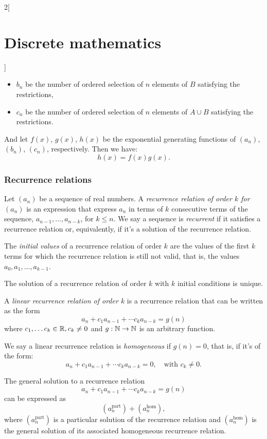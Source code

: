 \documentclass[../../../main.tex]{subfiles}
\begin{document}
\begin{multicols}{2}[\section{Discrete mathematics}]
\begin{prop}
\begin{itemize}
            \item $b_n$ be the number of ordered selection of $n$ elements of $B$ satisfying the restrictions,
            \item $c_n$ be the number of ordered selection of $n$ elements of $A\cup B$ satisfying the restrictions.
        \end{itemize}
        And let $f(x)$, $g(x)$, $h(x)$ be the exponential generating functions of $(a_n)$, $(b_n)$, $(c_n)$, respectively. Then we have: $$h(x)=f(x)g(x).$$
    \end{prop}
    \subsubsection*{Recurrence relations}
    \begin{definition}
        Let $(a_n)$ be a sequence of real numbers. A \textit{recurrence relation of order $k$ for $(a_n)$} is an expression that express $a_n$ in terms of $k$ consecutive terms of the sequence, $a_{n-1},\ldots,a_{n-k}$, for $k\leq n$. We say a sequence is \textit{recurrent} if it satisfies a recurrence relation or, equivalently, if it's a solution of the recurrence relation.
    \end{definition}
    \begin{definition}
        The \textit{initial values} of a recurrence relation of order $k$ are the values of the first $k$ terms for which the recurrence relation is still not valid, that is, the values $a_0,a_1,\ldots,a_{k-1}$.
    \end{definition}
    \begin{lemma}
        The solution of a recurrence relation of order $k$ with $k$ initial conditions is unique.
    \end{lemma}
    \begin{definition}
        A \textit{linear recurrence relation of order $k$} is a recurrence relation that can be written as the form $$a_n+c_1a_{n-1}+\cdots c_ka_{n-k}=g(n)$$ where $c_1,\ldots c_k\in\mathbb{R} , c_k\ne 0$ and $g:\mathbb{N} \rightarrow\mathbb{N} $ is an arbitrary function.
    \end{definition}
    \begin{definition}
        We say a linear recurrence relation is \textit{homogeneous} if $g(n)=0$, that is, if it's of the form: $$a_n+c_1a_{n-1}+\cdots c_ka_{n-k}=0,\quad\text{with }c_k\ne 0.$$
    \end{definition}
    \begin{prop}
        The general solution to a recurrence relation $$a_n+c_1a_{n-1}+\cdots c_ka_{n-k}=g(n)$$ can be expressed as $$(a_n^\text{part})+(a_n^\text{hom}),$$ where $(a_n^\text{part})$ is a particular solution of the recurrence relation and $(a_n^\text{hom})$ is the general solution of its associated homogeneous recurrence relation.

\end{prop}
\end{multicols}
\end{document}
